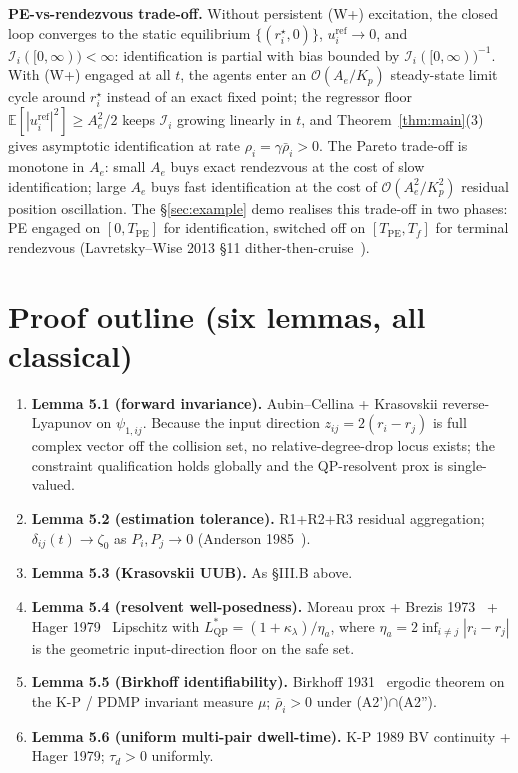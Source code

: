 \documentclass[letterpaper,10pt,conference]{IEEEtran}
\newcommand{\E}{\mathbb{E}}
\newcommand{\rhobar}{\bar\rho}
\begin{document}
\textbf{PE-vs-rendezvous trade-off.} Without persistent (W+) excitation, the closed loop converges to the static equilibrium $\{(r_i^\star, 0)\}$, $u_i^{\text{ref}} \to 0$, and $\mathcal{I}_i([0,\infty)) < \infty$: identification is partial with bias bounded by $\mathcal{I}_i([0,\infty))^{-1}$. With (W+) engaged at all $t$, the agents enter an $\mathcal{O}(A_e/K_p)$ steady-state limit cycle around $r_i^\star$ instead of an exact fixed point; the regressor floor $\E[|u_i^{\text{ref}}|^2]\ge A_e^2/2$ keeps $\mathcal{I}_i$ growing linearly in $t$, and Theorem~\ref{thm:main}(3) gives asymptotic identification at rate $\rho_i = \gamma\rhobar_i > 0$. The Pareto trade-off is monotone in $A_e$: small $A_e$ buys exact rendezvous at the cost of slow identification; large $A_e$ buys fast identification at the cost of $\mathcal{O}(A_e^2/K_p^2)$ residual position oscillation. The §\ref{sec:example} demo realises this trade-off in two phases: PE engaged on $[0, T_{\text{PE}}]$ for identification, switched off on $[T_{\text{PE}}, T_f]$ for terminal rendezvous (Lavretsky--Wise 2013 §11 dither-then-cruise~\cite{lavretskyWise2013}).

\section{Proof outline (six lemmas, all classical)}
\begin{enumerate}
\item \textbf{Lemma 5.1 (forward invariance).} Aubin--Cellina + Krasovskii reverse-Lyapunov on $\psi_{1,ij}$. Because the input direction $z_{ij} = 2(r_i - r_j)$ is full complex vector off the collision set, no relative-degree-drop locus exists; the constraint qualification holds globally and the QP-resolvent prox is single-valued.
\item \textbf{Lemma 5.2 (estimation tolerance).} R1+R2+R3 residual aggregation; $\delta_{ij}(t) \to \zeta_0$ as $P_i, P_j \to 0$ (Anderson 1985~\cite{anderson1985}).
\item \textbf{Lemma 5.3 (Krasovskii UUB).} As §III.B above.
\item \textbf{Lemma 5.4 (resolvent well-posedness).} Moreau prox + Brezis 1973~\cite{brezis1973} + Hager 1979~\cite{hager1979} Lipschitz with $L_{\text{QP}}^* = (1+\kappa_\lambda)/\eta_a$, where $\eta_a = 2\inf_{i\ne j} |r_i - r_j|$ is the geometric input-direction floor on the safe set.
\item \textbf{Lemma 5.5 (Birkhoff identifiability).} Birkhoff 1931~\cite{birkhoff1931} ergodic theorem on the K-P / PDMP invariant measure $\mu$; $\rhobar_i > 0$ under (A2')$\cap$(A2'').
\item \textbf{Lemma 5.6 (uniform multi-pair dwell-time).}\label{lem:dwell} K-P 1989 BV continuity + Hager 1979; $\tau_d > 0$ uniformly.
\end{enumerate}
\end{document}
